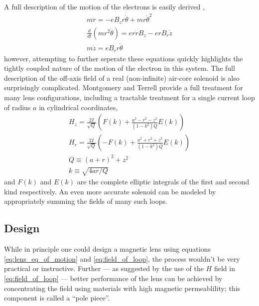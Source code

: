 A full description of the motion of the electrons is easily derived \cite{el-kareh_electron_1970},
\begin{subequations} \label{eq:lens_eq_of_motion}
\begin{gather}
  m \ddot{r} = -e B_z r \dot{\theta} + m r \dot{\theta}^2                 \\
  \frac{d}{dt} ( m r^2 \dot{\theta} ) = e r \dot{r} B_z - e r B_r \dot{z} \\
  m \ddot{z} = e B_r r \dot{\theta}
\end{gather}
\end{subequations}
however, attempting to further seperate these equations quickly highlights the tightly coupled nature of the motion of the electron in this system.
The full description of the off-axis field of a real (non-infinite) air-core solenoid is also surprisingly complicated.
Montgomery and Terrell \cite{montgomery_some_1961} provide a full treatment for many lens configurations, including a tractable treatment for a single current loop of radius $a$ in cylindrical coordinates, 
\begin{subequations} \label{eq:field_of_loop}
\begin{gather}
  H_z = \frac{2I}{\sqrt{Q}} \left(   F(k) + \frac{ a^2 - r^2 - z^2 }{ (1-k^2) Q } E(k) \right) \\
  H_r = \frac{2I}{\sqrt{Q}} \left( - F(k) + \frac{ a^2 + r^2 + z^2 }{ (1-k^2) Q } E(k) \right) \\
  Q \equiv (a+r)^2 + z^2 \\
  k \equiv \sqrt{ 4 a r / Q }
\end{gather}
\end{subequations}
and $F(k)$ and $E(k)$ are the complete elliptic integrals of the first and second kind respectively.
An even more accurate solenoid can be modeled by appropriately summing the fields of many such loops. 

\subsection{Design}

While in principle one could design a magnetic lens using equations \ref{eq:lens_eq_of_motion} and \ref{eq:field_of_loop}, the process wouldn't be very practical or instructive.
Further --- as suggested by the use of the $H$ field in \ref{eq:field_of_loop} --- better performance of the lens can be achieved by concentrating the field using materials with high magnetic permeablility; this component is called a ``pole piece''.

